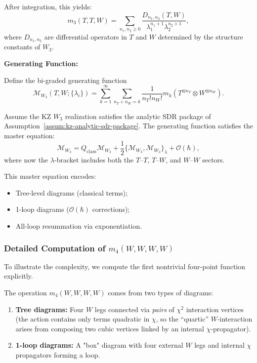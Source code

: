 After integration, this yields:
\begin{equation}
m_3(T,T,W) = \sum_{n_1, n_2 \geq 0} \frac{D_{n_1,n_2}(T,W)}{\lambda_1^{n_1+1} \lambda_2^{n_2+1}},
\end{equation}
where $D_{n_1,n_2}$ are differential operators in $T$ and $W$ determined by the structure constants of $W_3$.

\textbf{Generating Function:}

Define the bi-graded generating function
\begin{equation}
\mathcal{M}_{W_3}(T,W; \{\lambda_i\}) = \sum_{k=1}^\infty \sum_{n_T + n_W = k} \frac{1}{n_T! n_W!} m_k(T^{\otimes n_T} \otimes W^{\otimes n_W}).
\end{equation}

\begin{theorem}
Assume the KZ $W_3$ realization satisfies the analytic SDR package of
Assumption~\textup{\ref{assum:kz-analytic-sdr-package}}.
The generating function satisfies the master equation:
\begin{equation}
\mathcal{M}_{W_3} = Q_{\text{class}} \mathcal{M}_{W_3} + \frac{1}{2} \{\mathcal{M}_{W_3}, \mathcal{M}_{W_3}\}_{\lambda} + \mathcal{O}(\hbar),
\end{equation}
where now the $\lambda$-bracket includes both the $T$--$T$, $T$--$W$, and $W$--$W$ sectors.
\end{theorem}

This master equation encodes:
\begin{itemize}
\item Tree-level diagrams (classical terms);
\item 1-loop diagrams ($\mathcal{O}(\hbar)$ corrections);
\item All-loop resummation via exponentiation.
\end{itemize}

\subsubsection{Detailed Computation of $m_4(W,W,W,W)$}

To illustrate the complexity, we compute the first nontrivial four-point function explicitly.

\begin{construction}
The operation $m_4(W,W,W,W)$ comes from two types of diagrams:
\begin{enumerate}
\item \textbf{Tree diagrams:} Four $W$ legs connected via \emph{pairs} of $\chi^2$ interaction vertices (the action contains only terms quadratic in $\chi$, so the ``quartic'' $W$-interaction arises from composing two cubic vertices linked by an internal $\chi$-propagator).
\item \textbf{1-loop diagrams:} A "box" diagram with four external $W$ legs and internal $\chi$ propagators forming a loop.
\end{enumerate}
\end{construction}

